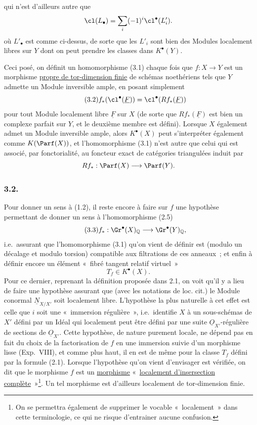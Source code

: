 qui n'est d'ailleurs autre que
\[
\cl(L_\bullet)=\sum_i(-1)^i\cl^\bullet(L'_i).
\]
où $L'_\bullet$ est comme ci-dessus, de sorte que les $L'_i$ sont bien des Modules localement libres sur $Y$ dont on peut prendre les classes dans $K^\bullet(Y)$.

Ceci posé, on définit un homomorphisme (3.1) chaque fois que $f:X\to Y$ est un morphisme \underline{propre de tor-dimension finie} de schémas noethériens tels que $Y$ admette un Module inversible ample, en posant simplement
\begin{equation}\tag{3.2}
f_*(\cl^\bullet(\underline F))=\cl^\bullet(Rf_*(\underline F))
\end{equation}
pour tout Module localement libre $\underline F$ sur $X$ (de sorte que $Rf_*(\underline F)$ est bien un complexe parfait sur $Y$, et le deuxième membre est défini). Lorsque $X$ également admet un Module inversible ample, alors $K^\bullet(X)$ peut s'interpréter également comme $K(\Parf(X))$, et l'homomorphisme (3.1) n'est autre que celui qui est associé, par fonctorialité, au foncteur exact de catégories triangulées induit par
\[
Rf_*:\Parf(X)\longrightarrow \Parf(Y).
\]

\subsubsection*{3.2.}
Pour donner un sens à (1.2), il reste encore à faire sur $f$ une hypothèse permettant de donner un sens à l'homomorphisme (2.5)
\begin{equation}\tag{3.3}
f_*:\Gr^\bullet(X)_{\mathbb Q}\longrightarrow \Gr^\bullet(Y)_{\mathbb Q},
\end{equation}
i.e.\ assurant que l'homomorphisme (3.1) qu'on vient de définir est (modulo un décalage et modulo torsion) compatible aux filtrations de ces anneaux~; et enfin à définir encore un élément «~fibré tangent relatif virtuel~»
\[
T_f\in K^\bullet(X).
\]
Pour ce dernier, reprenant la définition proposée dans 2.1, on voit qu'il y a lieu de faire une hypothèse assurant que (avec les notations de loc. cit.) le Module conormal $\underline N_{X/X'}$ soit localement libre. L'hypothèse la plus naturelle à cet effet est celle que $i$ soit une «~immersion régulière~», i.e.\ identifie $X$ à un sous-schémas de $X'$ défini par un Idéal qui localement peut être défini par une suite $\underline O_{X'}$-régulière de sections de $\underline O_{X'}$. Cette hypothèse, de nature purement locale, ne dépend pas en fait du choix de la factorisation de $f$ en une immersion suivie d'un morphisme lisse (Exp.\ VIII), et comme plus haut, il en est de même pour la classe $T_f$ défini par la formule (2.1). Lorsque l'hypothèse qu'on vient d'envisager est vérifiée, on dit que le morphisme $f$ est un \underline{morphisme} «~\underline{localement d'insersection complète}~»\footnote{On se permettra également de supprimer le vocable «~localement~» dans cette terminologie, ce qui ne risque d'entrainer aucune confusion.}. Un tel morphisme est d'ailleurs localement de tor-dimension finie.

